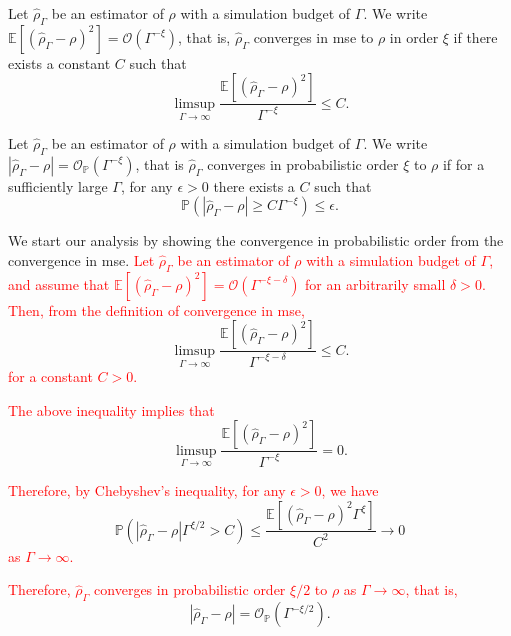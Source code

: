 \begin{definition}
    Let $\hat{\rho}_{\Gamma}$ be an estimator of $\rho$ with a simulation budget of $\Gamma$. 
    We write $\mathbb{E} \left[ \left(\hat{\rho}_{\Gamma} - \rho\right)^2 \right] = \mathcal{O} \left( \Gamma^{-\xi} \right)$, that is, $\hat{\rho}_{\Gamma}$ converges in \gls{mse} to $\rho$ in order $\xi$ if there exists a constant $C$ such that
    $$
        \limsup_{\Gamma \to \infty} \frac{\mathbb{E} \left[\left(\hat{\rho}_{\Gamma} - \rho\right)^2 \right]}{\Gamma^{-\xi}} \leq C.
    $$
\end{definition}

\begin{definition}
    Let $\hat{\rho}_{\Gamma}$ be an estimator of $\rho$ with a simulation budget of $\Gamma$. 
    We write $|\hat{\rho}_{\Gamma} - \rho| = \mathcal{O}_{\mathbb{P}}(\Gamma^{-\xi})$, that is $\hat{\rho}_{\Gamma}$ converges in probabilistic order $\xi$ to $\rho$ if for a sufficiently large $\Gamma$, for any $\epsilon > 0$ there exists a $C$ such that
    $$
         \mathbb{P} \left( \left| \hat{\rho}_{\Gamma} - \rho \right| \geq C \Gamma^{-\xi} \right) \leq \epsilon.
    $$
\end{definition}

We start our analysis by showing the convergence in probabilistic order from the convergence in \gls{mse}.
\textcolor{red}{Let $\hat{\rho}_{\Gamma}$ be an estimator of $\rho$ with a simulation budget of $\Gamma$, and assume that $\mathbb{E} \left[ \left(\hat{\rho}_{\Gamma} - \rho\right)^2 \right] = \mathcal{O} \left( \Gamma^{-\xi-\delta} \right)$ for an arbitrarily small $\delta > 0$.}
\textcolor{red}{Then, from the definition of convergence in \gls{mse}, }
$$
    \limsup_{\Gamma \to \infty} \frac{\mathbb{E} \left[ \left(\hat{\rho}_{\Gamma} - \rho\right)^2 \right]}{\Gamma^{-\xi-\delta}} \leq C.
$$
\textcolor{red}{for a constant $C > 0$.}

\textcolor{red}{The above inequality implies that}
$$
\limsup_{\Gamma \to \infty} \frac{\mathbb{E} \left[ \left(\hat{\rho}_{\Gamma} - \rho\right)^2 \right]}{\Gamma^{-\xi}} =0.
$$

\textcolor{red}{Therefore, by Chebyshev's inequality, for any $\epsilon > 0$, we have}
$$
\mathbb{P} \left( \left| \hat{\rho}_{\Gamma} - \rho \right| \Gamma^{\xi/2} > C  \right) \leq \frac{\mathbb{E} \left[ \left(\hat{\rho}_{\Gamma} - \rho\right)^2 \Gamma^{\xi} \right]}{C^2 } \rightarrow 0 
$$
\textcolor{red}{as $\Gamma \to \infty$.}

\textcolor{red}{Therefore, $\hat{\rho}_{\Gamma}$ converges in probabilistic order $\xi/2$ to $\rho$ as $\Gamma \to \infty$, that is,}
$$
\left| \hat{\rho}_{\Gamma} - \rho \right| = \mathcal{O}_{\mathbb{P}} \left( \Gamma^{-\xi/2} \right).
$$






